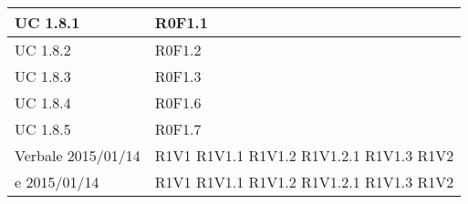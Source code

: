 \begin{center}
\begin{longtable}{| p{4cm} | p{4cm} |}
		\hline
		UC 1.8.1  &  R0F1.1 \\
		\hline
		UC 1.8.2  &  R0F1.2 \\
		\hline
		UC 1.8.3  &  R0F1.3 \\
		\hline
		UC 1.8.4  &  R0F1.6 \\
		\hline
		UC 1.8.5  &  R0F1.7 \\
		\hline
		Verbale 2015/01/14  &  R1V1 \newline R1V1.1 \newline R1V1.2 \newline R1V1.2.1 \newline R1V1.3 \newline R1V2 \\
		\hline
		e 2015/01/14  &  R1V1 \newline R1V1.1 \newline R1V1.2 \newline R1V1.2.1 \newline R1V1.3 \newline R1V2 \newline \\

	\end{longtable}
	\egroup
	\end{center}


